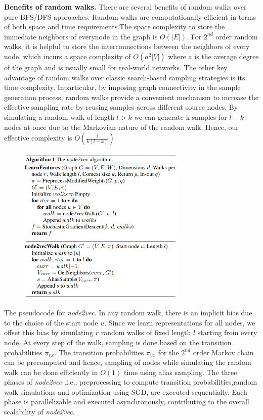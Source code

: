 \documentclass[12pt,a4paper]{article}
\begin{document}
\textbf{Benefits of random walks.} There are several benefits of random walks over pure BFS/DFS approaches. Random walks are computationally efficient in terms of both space and time requirements.The space complexity to store the immediate neighbors of everynode  in  the  graph  is $O(|E|)$.   For  $2^{nd}$ order  random  walks,  it  is helpful to store the interconnections between the neighbors of every node, which incurs a space complexity of $O(a^{2}|V|)$ where a is  the  average  degree  of  the  graph  and  is  usually  small  for  real-world networks.  The other key advantage of random walks over classic search-based sampling strategies is its time complexity.  Inparticular,  by imposing graph connectivity in the sample generation process, random walks provide a convenient mechanism to increase the effective sampling rate by reusing samples across different source nodes. By simulating a random walk of length $l > k$ we can generate k samples for $l-k$ nodes at once due to the Markovian nature of the random walk. Hence, our effective complexity is $O\left( \frac{l}{k(l-k)} \right)$


\begin{figure}[h]
\includegraphics[width=8cm]{node2vecAlgorithm}
\centering
\end{figure}

The pseudocode for \textit{node2vec}.  In any random walk, there is an implicit bias due to the choice of the start node $u$. Since we learn representations for all nodes, we offset this bias by simulating $r$ random walks of fixed length $l$ starting from every node.  At every step of the walk, sampling is done based on the transition probabilities $\pi_{vx}$. The transition probabilities $\pi_{vx}$ for the $2^{nd}$ order Markov chain can be precomputed and hence, sampling of nodes while simulating the random walk can be done efficiently in $O(1)$ time using alias sampling.  The three phases of \textit{node2vec} ,i.e.,  preprocessing to compute transition probabilities,random  walk  simulations  and  optimization  using  SGD,  are  executed sequentially. Each phase is parallelizable and executed asynchronously, contributing to the overall scalability of \textit{node2vec}.
\end{document}
